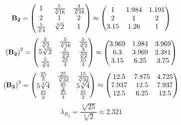 \documentclass[10pt,a4paper]{article}
\begin{document}
	\[
		\bold{B_2} = 
		\begin{pmatrix}
			{1} {} & \frac{{5}} {\sqrt[3]{16}} & \frac{{3}} {\sqrt[3]{16}} \\
			{{2}} {} & {1} {} & {{2}} {} \\
			\frac{{5}} {\sqrt[3]{4}} & {\sqrt[3]{2}} {} & {1} {} \\
		\end{pmatrix}
		\approx
		\begin{pmatrix}
			1        & 1.984    & 1.191    \\
			2        & 1        & 2        \\
			3.15     & 1.26     & 1        \\
		\end{pmatrix}
	\]
	\[
		\left(\bold{B_2}\right)^{2} = 
		\begin{pmatrix}
			\frac{{5}} {\sqrt[3]{2}} & \frac{{5}} {\sqrt[3]{16}} & \frac{{5}} {\sqrt[3]{2}} \\
			{{5}\sqrt[3]{2}} {} & \frac{{5}} {\sqrt[3]{2}} & \frac{{3}} {\sqrt[3]{2}} \\
			\frac{{5}} {\sqrt[3]{4}} & \frac{{25}} {{4}} & \frac{{15}} {{4}} \\
		\end{pmatrix}
		\approx
		\begin{pmatrix}
			3.969    & 1.984    & 3.969    \\
			6.3      & 3.969    & 2.381    \\
			3.15     & 6.25     & 3.75     \\
		\end{pmatrix}
	\]
	\[
		\left(\bold{B_2}\right)^{3} = 
		\begin{pmatrix}
			\frac{{25}} {{2}} & \frac{{25}} {\sqrt[3]{32}} & \frac{{15}} {\sqrt[3]{32}} \\
			{{5}\sqrt[3]{4}} {} & \frac{{25}} {{2}} & {{5}\sqrt[3]{4}} {} \\
			\frac{{25}} {{2}} & \frac{{25}} {{4}} & \frac{{25}} {{2}} \\
		\end{pmatrix}
		\approx
		\begin{pmatrix}
			12.5     & 7.875    & 4.725    \\
			7.937    & 12.5     & 7.937    \\
			12.5     & 6.25     & 12.5     \\
		\end{pmatrix}
	\]
	\[
		\lambda_{B_2} = \frac{\sqrt[3]{25}} {\sqrt[3]{2}}\approx 2.321
	\]
\end{document}
